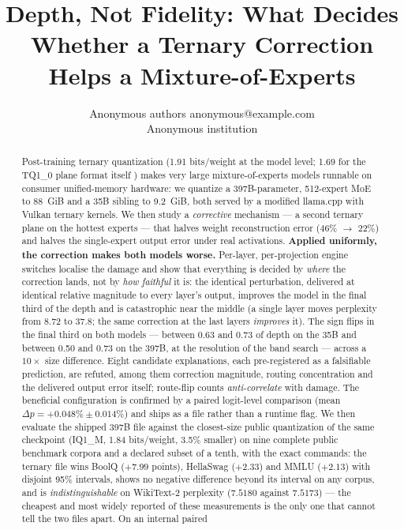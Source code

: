 \documentclass[10pt]{article} %
\title{Depth, Not Fidelity: What Decides Whether a Ternary Correction Helps a Mixture-of-Experts}
\author{\name Anonymous authors \email anonymous@example.com \\
      \addr Anonymous institution}
\begin{document}
\maketitle

\begin{abstract}
Post-training ternary quantization (1.91 bits/weight at the model level;
1.69 for the TQ1\_0 plane format itself \citep{compilade2024tq1}) makes very large
mixture-of-experts models runnable on consumer unified-memory hardware: we
quantize a 397B-parameter, 512-expert MoE to 88~GiB and a 35B sibling to
9.2~GiB, both served by a modified llama.cpp with Vulkan ternary kernels. We
then study a \emph{corrective} mechanism --- a second ternary plane on the
hottest experts --- that halves weight reconstruction error (46\% $\to$ 22\%)
and halves the single-expert output error under real activations.
\textbf{Applied uniformly, the correction makes both models worse.} Per-layer,
per-projection engine switches localise the damage and show that everything
is decided by \emph{where} the correction lands, not by \emph{how faithful} it
is: the identical perturbation, delivered at identical relative magnitude to
every layer's output, improves the model in the final third of the depth and
is catastrophic near the middle (a single layer moves perplexity from 8.72 to
37.8; the same correction at the last layers \emph{improves} it). The sign
flips in the final third on both models --- between 0.63 and 0.73 of depth on
the 35B and between 0.50 and 0.73 on the 397B, at the resolution of the band
search --- across a $10\times$ size difference. Eight candidate explanations,
each pre-registered as a falsifiable prediction, are refuted, among them
correction magnitude, routing concentration and the delivered output error
itself; route-flip counts \emph{anti-correlate} with damage. The beneficial
configuration is confirmed by a paired logit-level comparison (mean
$\Delta p = +0.048\% \pm 0.014\%$) and ships as a file rather than a runtime
flag. We then evaluate the shipped 397B file against the closest-size public
quantization of the same checkpoint (IQ1\_M, 1.84 bits/weight, 3.5\% smaller)
on nine complete public benchmark corpora and a declared subset of a tenth,
with the exact commands: the ternary file wins BoolQ ($+7.99$ points),
HellaSwag ($+2.33$) and MMLU ($+2.13$) with disjoint 95\% intervals, shows no
negative difference beyond its interval on any corpus, and is
\emph{indistinguishable} on WikiText-2 perplexity ($7.5180$ against
$7.5173$) --- the cheapest and most widely reported of these measurements is
the only one that cannot tell the two files apart. On an internal paired

\end{abstract}
\end{document}
